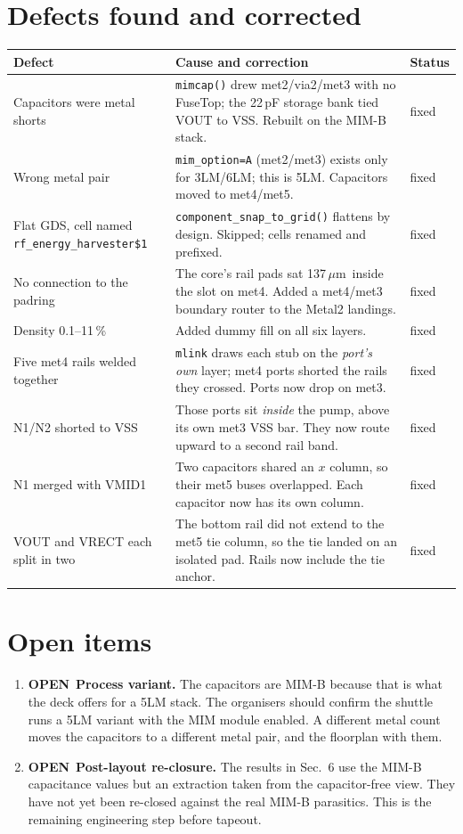 \documentclass[11pt,a4paper]{article}
\newcommand{\OPEN}{\textcolor{orange!80!black}{\textbf{OPEN}}}
\newcommand{\um}{\,$\mu$m}
\begin{document}
\section{Defects found and corrected}

\begin{longtable}{@{}p{}p{}l@{}}
\toprule
\textbf{Defect} & \textbf{Cause and correction} & \textbf{Status} \\
\midrule
\endhead
Capacitors were metal shorts & \texttt{mimcap()} drew met2/via2/met3 with no FuseTop; the 22\,pF storage bank tied VOUT to VSS. Rebuilt on the MIM-B stack. & fixed \\
Wrong metal pair & \texttt{mim\_option=A} (met2/met3) exists only for 3LM/6LM; this is 5LM. Capacitors moved to met4/met5. & fixed \\
Flat GDS, cell named \texttt{rf\_energy\_harvester\$1} & \texttt{component\_snap\_to\_grid()} flattens by design. Skipped; cells renamed and prefixed. & fixed \\
No connection to the padring & The core's rail pads sat 137\um\ inside the slot on met4. Added a met4/met3 boundary router to the Metal2 landings. & fixed \\
Density 0.1--11\,\% & Added dummy fill on all six layers. & fixed \\
Five met4 rails welded together & \texttt{mlink} draws each stub on the \emph{port's own} layer; met4 ports shorted the rails they crossed. Ports now drop on met3. & fixed \\
N1/N2 shorted to VSS & Those ports sit \emph{inside} the pump, above its own met3 VSS bar. They now route upward to a second rail band. & fixed \\
N1 merged with VMID1 & Two capacitors shared an $x$ column, so their met5 buses overlapped. Each capacitor now has its own column. & fixed \\
VOUT and VRECT each split in two & The bottom rail did not extend to the met5 tie column, so the tie landed on an isolated pad. Rails now include the tie anchor. & fixed \\
\bottomrule
\end{longtable}

\section{Open items}

\begin{enumerate}
\item \OPEN\ \textbf{Process variant.} The capacitors are MIM-B because that is what the deck
offers for a 5LM stack. The organisers should confirm the shuttle runs a 5LM variant with the
MIM module enabled. A different metal count moves the capacitors to a different metal pair, and
the floorplan with them.
\item \OPEN\ \textbf{Post-layout re-closure.} The results in Sec.~6 use the MIM-B capacitance
values but an extraction taken from the capacitor-free view. They have not yet been re-closed
against the real MIM-B parasitics. This is the remaining engineering step before tapeout.
\end{enumerate}
\end{document}
